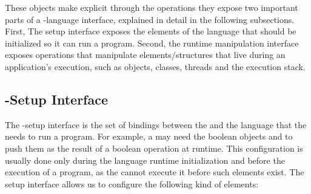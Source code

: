 These objects make explicit through the operations they expose two important parts of a \VM-language interface, explained in detail in the following subsections. First, The \VM setup interface exposes the elements of the language that should be initialized so it can run a program. Second, the runtime manipulation interface exposes operations that manipulate elements/structures that live during an application's execution, such as objects, classes, threads and the execution stack.

\subsection{\VM-Setup Interface}

The \VM-setup interface is the set of bindings between the \VM and the language that the \VM needs to run a program.
For example, a \VM may need the boolean objects  and  to push them as the result of a boolean operation at runtime.
This configuration is usually done only during the language runtime initialization and before the execution of a program, as the \VM cannot execute it before such elements exist.
The \VM setup interface allows us to configure the following kind of elements:

